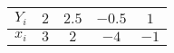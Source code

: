 \begin{tabular}{|c|c|c|c|c|}
\hline
$Y_i$ & $2$ & $2.5$ & $-0.5$ & $1$ \\\hline
$x_i$ & $3$ & $2$ & $-4$ & $-1$ \\
\hline
\end{tabular}
